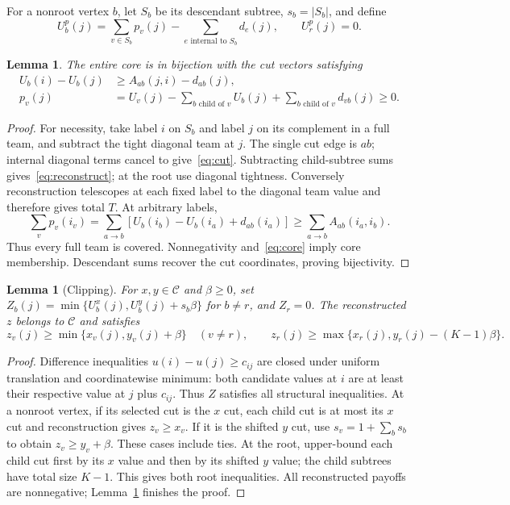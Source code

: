 \documentclass[11pt]{article}
\newtheorem{lemma}[theorem]{Lemma}
\theoremstyle{remark}\newtheorem{remark}[theorem]{Remark}
\newcommand{\core}{\mathcal C}
\begin{document}
For a nonroot vertex $b$, let $S_b$ be its descendant subtree, $s_b=|S_b|$,
and define
\[
 U_b^p(j)=\sum_{v\in S_b}p_v(j)
                -\sum_{e\text{ internal to }S_b}d_e(j),\qquad U_r^p(j)=0.
\]
\begin{lemma}\label{lem:cut}
The entire core is in bijection with the cut vectors satisfying
\begin{align}
 U_b(i)-U_b(j)&\ge A_{ab}(j,i)-d_{ab}(j),\label{eq:cut}\\
 p_v(j)&=U_v(j)-\sum_{b\text{ child of }v}U_b(j)
                   +\sum_{b\text{ child of }v}d_{vb}(j)\ge0.\label{eq:reconstruct}
\end{align}
\end{lemma}
\begin{proof}
For necessity, take label $i$ on $S_b$ and label $j$ on its complement in a
full team, and subtract the tight diagonal team at $j$. The single cut edge
is $ab$; internal diagonal terms cancel to give~\eqref{eq:cut}.
Subtracting child-subtree sums gives~\eqref{eq:reconstruct}; at the root use
diagonal tightness. Conversely reconstruction telescopes at each fixed label
to the diagonal team value and therefore gives total $T$. At arbitrary labels,
\[
 \sum_v p_v(i_v)=\sum_{a\to b}
 [U_b(i_b)-U_b(i_a)+d_{ab}(i_a)]
 \ge\sum_{a\to b}A_{ab}(i_a,i_b).
\]
Thus every full team is covered. Nonnegativity and~\eqref{eq:core} imply core
membership. Descendant sums recover the cut coordinates, proving bijectivity.
\end{proof}

\begin{lemma}[Clipping]\label{lem:clip}
For $x,y\in\core$ and $\beta\ge0$, set
$Z_b(j)=\min\{U_b^x(j),U_b^y(j)+s_b\beta\}$ for $b\ne r$, and $Z_r=0$.
The reconstructed $z$ belongs to $\core$ and satisfies
\[
 z_v(j)\ge\min\{x_v(j),y_v(j)+\beta\}\quad(v\ne r),\qquad
 z_r(j)\ge\max\{x_r(j),y_r(j)-(K-1)\beta\}.
\]
\end{lemma}
\begin{proof}
Difference inequalities $u(i)-u(j)\ge c_{ij}$ are closed under uniform
translation and coordinatewise minimum: both candidate values at $i$ are at
least their respective value at $j$ plus $c_{ij}$. Thus $Z$ satisfies all
structural inequalities. At a nonroot vertex, if its selected cut is the $x$
cut, each child cut is at most its $x$ cut and reconstruction gives $z_v\ge x_v$.
If it is the shifted $y$ cut, use $s_v=1+\sum_b s_b$ to obtain
$z_v\ge y_v+\beta$. These cases include ties. At the root, upper-bound each
child cut first by its $x$ value and then by its shifted $y$ value; the child
subtrees have total size $K-1$. This gives both root inequalities. All
reconstructed payoffs are nonnegative; Lemma~\ref{lem:cut} finishes the proof.
\end{proof}
\end{document}
